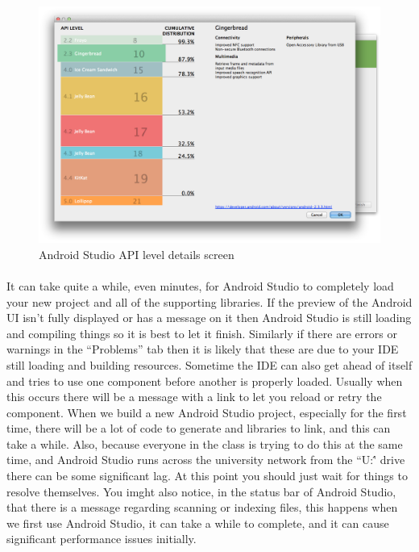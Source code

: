 \documentclass[12pt, a4paper, twoside]{book}
\begin{document}
\begin{figure}[H]
\centering
\includegraphics[width=\textwidth]{images/android-studio_05_api-level-details}
\caption{Android Studio API level details screen}
\label{fig:android.studio_apidetails}
\end{figure}

\paragraph{} It can take quite a while, even minutes, for Android Studio to completely load your new project and all of the supporting libraries. If the preview of the Android UI isn't fully displayed or has a message on it then Android Studio is still loading and compiling things so it is best to let it finish. Similarly if there are errors or warnings in the ``Problems'' tab then it is likely that these are due to your IDE still loading and building resources. Sometime the IDE can also get ahead of itself and tries to use one component before another is properly loaded. Usually when this occurs there will be a message with a link to let you reload or retry the component. When we build a new Android Studio project, especially for the first time, there will be a lot of code to generate and libraries to link, and this can take a while. Also, because everyone in the class is trying to do this at the same time, and Android Studio runs across the university network from the ``U:\'' drive there can be some significant lag. At this point you should just wait for things to resolve themselves. You imght also notice, in the status bar of Android Studio, that there is a message regarding scanning or indexing files, this happens when we first use Android Studio, it can take a while to complete, and it can cause significant performance issues initially.
\end{document}
